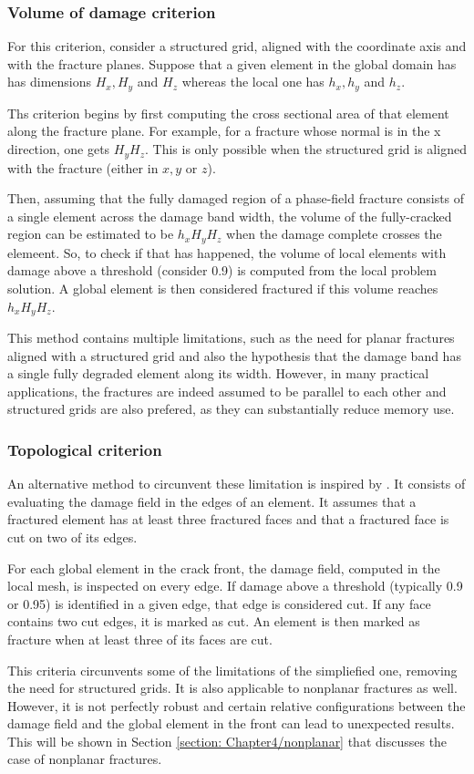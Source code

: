 \subsubsection{Volume of damage criterion}

For this criterion, consider a structured grid, aligned with the coordinate axis and with the fracture planes. Suppose that a given element in the global domain has has dimensions $H_x, H_y$ and $H_z$ whereas the local one has $h_x, h_y$ and $h_z$.

Ths criterion begins by first computing the cross sectional area of that element along the fracture plane. For example, for a fracture whose normal is in the x direction, one gets $H_yH_z$. This is only possible when the structured grid is aligned with the fracture (either in $x, y$ or $z$).

Then, assuming that the fully damaged region of a phase-field fracture consists of a single element across the damage band width, the volume of the fully-cracked region can be estimated to be $h_xH_yH_z$ when the damage complete crosses the elemeent. So, to check if that has happened, the volume of local elements with damage above a threshold (consider 0.9) is computed from the local problem solution. A global element is then considered fractured if this volume reaches $h_xH_yH_z$.

This method contains multiple limitations, such as the need for planar fractures aligned with a structured grid and also the hypothesis that the damage band has a single fully degraded element along its width. However, in many practical applications, the fractures are indeed assumed to be parallel to each other and structured grids are also prefered, as they can substantially reduce memory use. 

\subsubsection{Topological criterion}

An alternative method to circunvent these limitation is inspired by \cite{muixi2021combined}. It consists of evaluating the damage field in the edges of an element. It assumes that a fractured element has at least three fractured faces and that a fractured face is cut on two of its edges.

For each global element in the crack front, the damage field, computed in the local mesh, is inspected on every edge. If damage above a threshold (typically 0.9 or 0.95) is identified in a given edge, that edge is considered cut. If any face contains two cut edges, it is marked as cut. An element is then marked as fracture when at least three of its faces are cut.

This criteria circunvents some of the limitations of the simpliefied one, removing the need for structured grids. It is also applicable to nonplanar fractures as well. However, it is not perfectly robust and certain relative configurations between the damage field and the global element in the front can lead to unexpected results. This will be shown in Section \ref{section: Chapter4/nonplanar} that discusses the case of nonplanar fractures.
